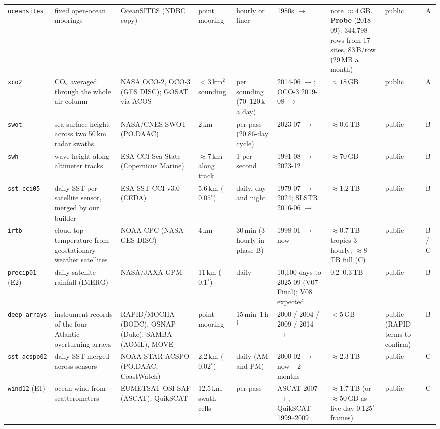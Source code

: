 \documentclass[10pt]{article}
\newcommand{\code}[1]{\texttt{#1}}
\begin{document}
{\begin{longtable}{@{}L{1.65cm}L{2.9cm}L{2.2cm}L{1.7cm}L{1.75cm}L{1.95cm}L{2.75cm}L{1.25cm}L{0.65cm}@{}}
\code{oceansites} & fixed open-ocean moorings & OceanSITES (NDBC copy) & point mooring & hourly or finer & 1980s $\to$ & note $\approx 4$\,GB. \textbf{Probe} (2018-09): 344,798 rows from 17 sites, 83\,B/row (29\,MB a month) & public & A \\
\code{xco2} & CO$_2$ averaged through the whole air column & NASA OCO-2, OCO-3 (GES DISC); GOSAT via ACOS & $<3$\,km$^2$ sounding & per sounding (70--120\,k a day) & 2014-06 $\to$; OCO-3 2019-08 $\to$ & $\approx 18$\,GB & public & A \\
\code{swot} & sea-surface height across two 50\,km radar swaths & NASA/CNES SWOT (PO.DAAC) & 2\,km & per pass (20.86-day cycle) & 2023-07 $\to$ & $\approx 0.6$\,TB & public & B \\
\code{swh} & wave height along altimeter tracks & ESA CCI Sea State (Copernicus Marine) & $\approx 7$\,km along track & 1 per second & 1991-08 $\to$ 2023-12 & $\approx 70$\,GB & public & B \\
\code{sst\_cci05} & daily SST per satellite sensor, merged by our builder & ESA SST CCI v3.0 (CEDA) & 5.6\,km ($0.05^\circ$) & daily, day and night & 1979-07 $\to$ 2024; SLSTR 2016-06 $\to$ & $\approx 1.2$\,TB & public & B \\
\code{irtb} & cloud-top temperature from geostationary weather satellites & NOAA CPC (NASA GES DISC) & 4\,km & 30\,min (3-hourly in phase B) & 1998-01 $\to$ now & $\approx 0.7$\,TB tropics 3-hourly; $\approx 8$\,TB full (C) & public & B / C \\
\code{precip01} (E2) & daily satellite rainfall (IMERG) & NASA/JAXA GPM & 11\,km ($0.1^\circ$) & daily & 10,100 days to 2025-09 (V07 Final); V08 expected & 0.2--0.3\,TB & public & B \\
\code{deep\_arrays} & instrument records of the four Atlantic overturning arrays & RAPID/MOCHA (BODC), OSNAP (Duke), SAMBA (AOML), MOVE & point mooring & 15\,min--1\,h$^\dagger$ & 2000 / 2004 / 2009 / 2014 $\to$ & $<5$\,GB & public (RAPID terms to confirm) & B \\
\code{sst\_acspo02} & daily SST merged across sensors & NOAA STAR ACSPO (PO.DAAC, CoastWatch) & 2.2\,km ($0.02^\circ$) & daily (AM and PM) & 2000-02 $\to$ now $-2$ months & $\approx 2.3$\,TB & public & C \\
\code{wind12} (E1) & ocean wind from scatterometers & EUMETSAT OSI SAF (ASCAT); QuikSCAT & 12.5\,km swath cells & per pass & ASCAT 2007 $\to$; QuikSCAT 1999--2009 & $\approx 1.7$\,TB (or $\approx 50$\,GB as five-day $0.125^\circ$ frames) & public & C \\

\end{longtable}}
\end{document}
